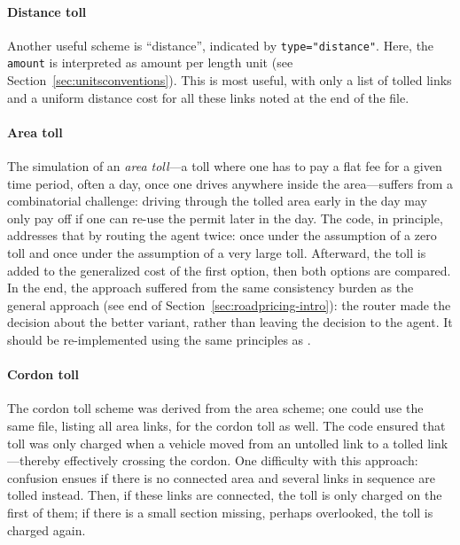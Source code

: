 \paragraph{Distance toll} Another useful scheme is ``distance'', indicated by \lstinline$type="distance"$. Here, the \lstinline$amount$ is interpreted as amount per length unit (see Section~\ref{sec:unitsconventions}). This is most useful, with only a list of tolled links and a uniform distance cost for all these links noted at the end of the file.

\paragraph{Area toll} The simulation of an \emph{area toll}---\ie a toll where one has to pay a flat fee for a given time period, often a day, once one drives anywhere inside the area---suffers from a combinatorial challenge: driving through the tolled area early in the day may only pay off if one can re-use the permit later in the day. The code, in principle, addresses that by routing the agent twice: once under the assumption of a zero toll and once under the assumption of a very large toll. Afterward, the toll is added to the generalized cost of the first option, then both options are compared.  
%
In the end, the approach suffered from the same consistency burden as the general approach (see end of Section~\ref{sec:roadpricing-intro}): the router made the decision about the better variant, rather than leaving the decision to the agent. It should be re-implemented using the same principles as \citet{NagelKickhoeferJoubert2014HeterogeneousVoTsPROCEDIA}.

\paragraph{Cordon toll} The cordon toll scheme was derived from the area scheme; one could use the same file, listing all area links, for the cordon toll as well. The code ensured that toll was only charged when a vehicle moved from an untolled link to a tolled link---thereby effectively crossing the cordon. One difficulty with this approach: confusion ensues if there is no connected area and several links in sequence are tolled instead.  Then, if these links are connected, the toll is only charged on the first of them; if there is a small section missing, perhaps overlooked, the toll is charged again. 



